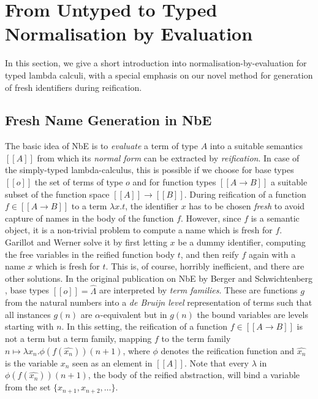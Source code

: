 \documentclass{LMCS}
\theoremstyle{plain}\newtheorem{satz}[thm]{Satz}
\newcommand{\den}{\semc}
\newcommand{\semc}[1]{[\![#1]\!]}
\begin{document}
 

\section{From Untyped to Typed Normalisation by Evaluation}
\label{sec:nbe-primer}

\noindent In this section, we give a short introduction into
normalisation-by-evaluation for typed lambda calculi, with a special
emphasis on our novel method for generation of fresh identifiers during
reification.

\subsection{Fresh Name Generation in NbE}

The basic idea of NbE is to \emph{evaluate} a term of type $A$ into a
suitable semantics $\den A$ from which its \emph{normal form} can be
extracted by \emph{reification}.  In case of the simply-typed
lambda-calculus, this is possible if we choose for base types $\den o$
the set of terms of type $o$ and for function types $\den{A \to B}$ a
suitable subset of the function space $\den A \to \den B$.  During
reification of a function $f \in \den{A \to B}$ to a term $\lambda x.
t$, the identifier $x$ has to be chosen \emph{fresh} to avoid capture
of names in the body of the function $f$.  However, since $f$ is a
semantic object, it is a non-trivial problem to compute a name which
is fresh for $f$.  Garillot and Werner \cite{garillotWerner:tphols07}
solve it by first letting $x$ be a dummy identifier, computing the
free variables in the reified function body $t$, and then reify $f$
again with a name $x$ which is fresh for $t$.  This is, of course,
horribly inefficient, and there are other solutions.  In the original
publication on NbE by Berger and Schwichtenberg
\cite{bergerSchwichtenberg:lics91}, base types $\den o =
\widehat\Lambda$ are interpreted by \emph{term families}.  These are
functions $g$ from the natural numbers into a \emph{de Bruijn level}
representation of terms such that all instances $g(n)$ are
$\alpha$-equivalent but in $g(n)$ the bound variables are levels
starting with $n$. In this setting, the reification of a function $f
\in \den{A \to B}$ is not a term but a term family, mapping $f$ to the
term family $n \mapsto \lambda x_n . \phi (f(\widehat{x_n})) (n+1)$,
where $\phi$ denotes the reification function and $\widehat{x_n}$ is
the variable $x_n$ seen as an element in $\den A$. 
Note that every $\lambda$ in $\phi (f(\widehat{x_n})) (n+1)$, 
the body of the reified abstraction, will bind a variable 
from the set $\{x_{n+1}, x_{n+2}, \ldots\}$.
\end{document}
